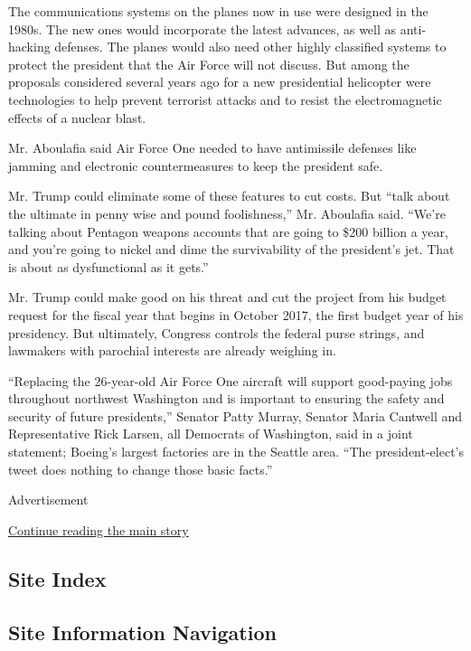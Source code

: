 The communications systems on the planes now in use were designed in the
1980s. The new ones would incorporate the latest advances, as well as
anti-hacking defenses. The planes would also need other highly
classified systems to protect the president that the Air Force will not
discuss. But among the proposals considered several years ago for a new
presidential helicopter were technologies to help prevent terrorist
attacks and to resist the electromagnetic effects of a nuclear blast.

Mr. Aboulafia said Air Force One needed to have antimissile defenses
like jamming and electronic countermeasures to keep the president safe.

Mr. Trump could eliminate some of these features to cut costs. But
``talk about the ultimate in penny wise and pound foolishness,'' Mr.
Aboulafia said. ``We're talking about Pentagon weapons accounts that are
going to \$200 billion a year, and you're going to nickel and dime the
survivability of the president's jet. That is about as dysfunctional as
it gets.''

Mr. Trump could make good on his threat and cut the project from his
budget request for the fiscal year that begins in October 2017, the
first budget year of his presidency. But ultimately, Congress controls
the federal purse strings, and lawmakers with parochial interests are
already weighing in.

``Replacing the 26-year-old Air Force One aircraft will support
good-paying jobs throughout northwest Washington and is important to
ensuring the safety and security of future presidents,'' Senator Patty
Murray, Senator Maria Cantwell and Representative Rick Larsen, all
Democrats of Washington, said in a joint statement; Boeing's largest
factories are in the Seattle area. ``The president-elect's tweet does
nothing to change those basic facts.''

Advertisement

\protect\hyperlink{after-bottom}{Continue reading the main story}

\hypertarget{site-index}{%
\subsection{Site Index}\label{site-index}}

\hypertarget{site-information-navigation}{%
\subsection{Site Information
Navigation}\label{site-information-navigation}}

